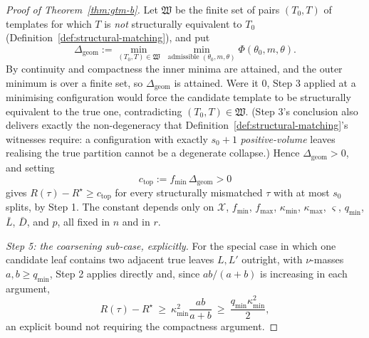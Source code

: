 \documentclass[11pt]{article}
\theoremstyle{plain}
\theoremstyle{definition}
\theoremstyle{remark}
\newcommand{\cX}{\mathcal{X}}
\begin{document}
\begin{proof}[Proof of Theorem~\ref{thm:gtm-b}]
Let \(\mathfrak W\) be the finite set of pairs \((T_0,T)\) of templates for
which \(T\) is \emph{not} structurally equivalent to \(T_0\)
(Definition~\ref{def:structural-matching}), and put
\[
  \Delta_{\mathrm{geom}}
  :=
  \min_{(T_0,T)\in\mathfrak W}\ \min_{\text{admissible }(\theta_0,m,\theta)}
  \Phi(\theta_0,m,\theta).
\]
By continuity and compactness the inner minima are attained, and the outer
minimum is over a finite set, so \(\Delta_{\mathrm{geom}}\) is attained. Were
it \(0\), Step 3 applied at a minimising configuration would force the
candidate template to be structurally equivalent to the true one, contradicting
\((T_0,T)\in\mathfrak W\). (Step 3's conclusion also delivers exactly the
non-degeneracy that Definition~\ref{def:structural-matching}'s witnesses
require: a configuration with exactly \(s_0+1\) \emph{positive-volume} leaves
realising the true partition cannot be a degenerate collapse.) Hence
\(\Delta_{\mathrm{geom}}>0\), and setting
\[
  c_{\mathrm{top}}:=f_{\min}\,\Delta_{\mathrm{geom}}>0
\]
gives \(R(\tau)-R^\star\ge c_{\mathrm{top}}\) for every structurally
mismatched \(\tau\) with at most \(s_0\) splits, by Step 1. The constant
depends only on \(\cX\), \(f_{\min}\), \(f_{\max}\), \(\kappa_{\min}\),
\(\kappa_{\max}\), \(\varsigma\), \(q_{\min}\), \(\bar L\), \(\bar D\), and
\(p\), all fixed in \(n\) and in \(r\).

\emph{Step 5: the coarsening sub-case, explicitly.}
For the special case in which one candidate leaf contains two adjacent true
leaves \(L,L'\) outright, with \(\nu\)-masses \(a,b\ge q_{\min}\), Step 2
applies directly and, since \(ab/(a+b)\) is increasing in each argument,
\[
  R(\tau)-R^\star
  \ \ge\
  \kappa_{\min}^2\frac{ab}{a+b}
  \ \ge\
  \frac{q_{\min}\kappa_{\min}^2}{2},
\]
an explicit bound not requiring the compactness argument.
\end{proof}
\end{document}
